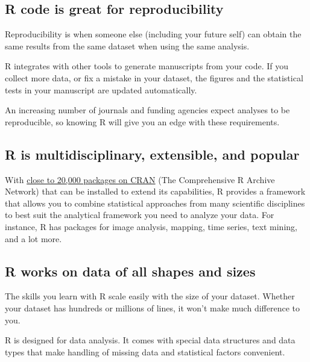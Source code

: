 \documentclass[
]{book}
\begin{document}
\hypertarget{r-code-is-great-for-reproducibility}{%
\subsection{R code is great for reproducibility}\label{r-code-is-great-for-reproducibility}}

Reproducibility is when someone else (including your future self) can obtain the
same results from the same dataset when using the same analysis.

R integrates with other tools to generate manuscripts from your code. If you
collect more data, or fix a mistake in your dataset, the figures and the
statistical tests in your manuscript are updated automatically.

An increasing number of journals and funding agencies expect analyses to be
reproducible, so knowing R will give you an edge with these requirements.

\hypertarget{r-is-multidisciplinary-extensible-and-popular}{%
\subsection{R is multidisciplinary, extensible, and popular}\label{r-is-multidisciplinary-extensible-and-popular}}

With \href{https://cran.r-project.org/web/packages}{close to 20,000 packages on CRAN} (The Comprehensive R Archive Network) that can be installed to extend its capabilities, R
provides a framework that allows you to combine statistical approaches from many
scientific disciplines to best suit the analytical framework you need to analyze your
data. For instance, R has packages for image analysis, mapping, time series, text mining, and a lot more.

\hypertarget{r-works-on-data-of-all-shapes-and-sizes}{%
\subsection{R works on data of all shapes and sizes}\label{r-works-on-data-of-all-shapes-and-sizes}}

The skills you learn with R scale easily with the size of your dataset. Whether
your dataset has hundreds or millions of lines, it won't make much difference to
you.

R is designed for data analysis. It comes with special data structures and data
types that make handling of missing data and statistical factors convenient.
\end{document}
